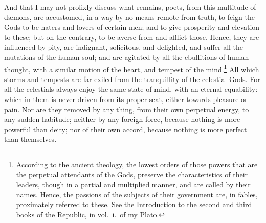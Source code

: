 \documentclass[12pt]{article}
\begin{document}
\noindent And that I may not prolixly discuss what remains, poets, from this
multitude of d{\ae}mons, are accustomed, in a way by no means remote from
truth, to feign the Gods to be haters and lovers of certain men; and to give
prosperity and elevation to these; but on the contrary, to be averse from and
afflict those. Hence, they are influenced by pity, are indignant, solicitous,
and delighted, and suffer all the mutations of the human soul; and are agitated
by all the ebullitions of human thought, with a similar motion of the heart,
and tempest of the mind.\footnote{According to the ancient theology, the lowest
orders of those powers that are the perpetual attendants of the Gods, preserve
the characteristics of their leaders, though in a partial and multiplied
manner, and are called by their names. Hence, the passions of the subjects of
their government are, in fables, proximately referred to these. See the
Introduction to the second and third books of the Republic, in
vol.~i.~of my Plato.} All which storms and tempests are far exiled
from the tranquillity of the celestial Gods. For all the celestials always
enjoy the same state of mind, with an eternal equability: which in them is
never driven from its proper seat, either towards pleasure or pain. Nor are
they removed by any thing, from their own perpetual energy, to any sudden
habitude; neither by any foreign force, because nothing is more powerful than
deity; nor of their own accord, because nothing is more perfect than
themselves.
\end{document}
